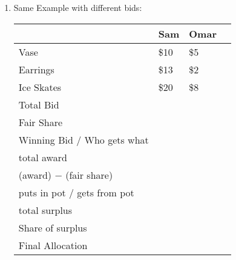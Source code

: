 \documentclass[12pt]{article}
\begin{document}
\begin{enumerate}
\begin{tabular}{|p{2in} || p{2in} |p{2in} | p{1in}}
\end{tabular}

\newpage

\item Same Example with different bids: %

\begin{tabular}{|p{2in} || p{2in} |p{2in} | p{1in}}
\hline
& Sam & Omar \\ \hline \hline
Vase & \$10 & \$5 \\[12 pt] \hline
Earrings & \$13 & \$2 \\[12 pt] \hline
Ice Skates & \$20 & \$8 \\[12 pt] \hline
Total Bid & & \\[12 pt] \hline
Fair Share & & \\[12 pt] \hline
 Winning Bid / Who gets what && \\[12pt] \hline
 total award && \\[12pt] \hline
 (award) $-$ (fair share) && \\[12 pt] \hline
 puts in pot / gets from pot && \\[12 pt] \hline
 total surplus && \\[12 pt] \hline
 Share of surplus && \\[12 pt] \hline
 Final Allocation && \\[28 pt] \hline

\end{tabular}

\end{enumerate}
\end{document}
